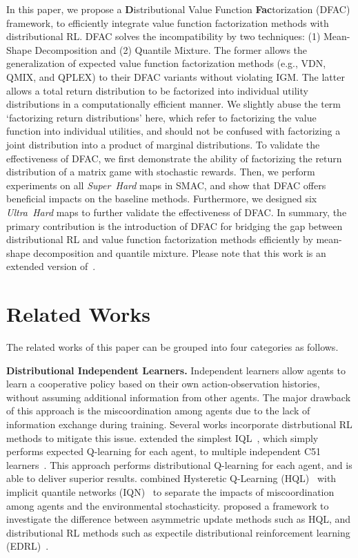 \documentclass[twoside,11pt]{article}
\newcommand{\superhard}{\textit{Super~Hard}}
\newcommand{\ultrahard}{\textit{Ultra~Hard}}
\begin{document}
In this paper, we propose a \textbf{D}istributional Value Function \textbf{Fac}torization (DFAC) framework, to efficiently integrate value function factorization methods with distributional RL.
DFAC solves the incompatibility by two techniques: (1) Mean-Shape Decomposition and (2) Quantile Mixture. The former allows the generalization of expected value function factorization methods (e.g., VDN, QMIX, and QPLEX) to their DFAC variants without violating IGM. The latter allows a total return distribution to be factorized into individual utility distributions in a computationally efficient manner.  We slightly abuse the term `factorizing return distributions' here, which refer to factorizing the value function into individual utilities, and should not be confused with factorizing a joint distribution into a product of marginal distributions.
To validate the effectiveness of DFAC, we first demonstrate the ability of factorizing the return distribution of a matrix game with stochastic rewards.
Then, we perform experiments on all \superhard{} maps in SMAC, and show that DFAC offers beneficial impacts on the baseline methods.
Furthermore, we designed six \ultrahard{} maps to further validate the effectiveness of DFAC. In summary, the primary contribution is the introduction of DFAC for bridging the gap between distributional RL and value function factorization methods efficiently by mean-shape decomposition and quantile mixture. Please note that this work is an extended version of~\cite{sun21dfac}.
 \section{Related Works}
\label{sec:sup:related_work}

The related works of this paper can be grouped into four categories as follows.

\textbf{Distributional Independent Learners.} Independent learners allow agents to learn a cooperative policy based on their own action-observation histories, without assuming additional information from other agents.
The major drawback of this approach is the miscoordination among agents due to the lack of information exchange during training. Several works incorporate distrbutional RL methods to mitigate this issue.
\cite{Da2019IQLC51} extended the simplest IQL~\citep{Tan1993IQL}, which simply performs expected Q-learning for each agent, to multiple independent C51 learners~\citep{Bellemare2017C51}. This approach performs distributional Q-learning for each agent, and is able to deliver superior results.
\cite{Lyu2020LikelihoodQuantile} combined Hysteretic Q-Learning (HQL)~\citep{Matignon2007Hysteretic,omidshafiei2017deep} with implicit quantile networks (IQN)~\citep{Dabney2018IQN} to separate the impacts of miscoordination among agents and the environmental stochasticity. \cite{Rowland2021TemporalDA} proposed a framework to investigate the difference between asymmetric update methods such as HQL, and distributional RL methods such as  expectile distributional reinforcement learning (EDRL)~\citep{Rowland2019ER-DQN}.
\end{document}
